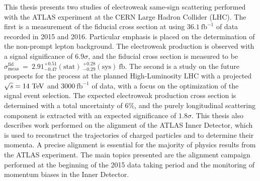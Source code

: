 This thesis presents two studies of electroweak same-sign \ssww scattering performed with the ATLAS experiment at the CERN Large Hadron Collider (LHC).
The first is a measurement of the fiducial cross section at  using $36.1~\mathrm{fb}^{-1}$ of data recorded in 2015 and 2016.
Particular emphasis is placed on the determination of the non-prompt lepton background.
The electroweak production is observed with a signal significance of $6.9\sigma$, and the fiducial cross section is measured to be $\sigma_{\textrm{meas}}^{\textrm{fid}}~=~2.91^{+0.51}_{-0.47}(\textrm{stat})~^{+0.28}_{-0.29}(\textrm{sys})~\textrm{fb}$.
The second is a study on the future prospects for the \ssww process at the planned High-Luminosity LHC with a projected $\sqrt{s}=14\tev$ and $3000~\mathrm{fb}^{-1}$ of data, with a focus on the optimization of the signal event selection.
The expected electroweak production cross section is determined with a total uncertainty  of $6\%$, and the purely longitudinal scattering component is extracted with an expected significance of $1.8\sigma$.
This thesis also describes work performed on the alignment of the ATLAS Inner Detector, which is used to reconstruct the trajectories of charged particles and to determine their momenta.
A precise alignment is essential for the majority of physics results from the ATLAS experiment.
The main topics presented are the alignment campaign performed at the beginning of the 2015 data taking period and the monitoring of momentum biases in the Inner Detector.
